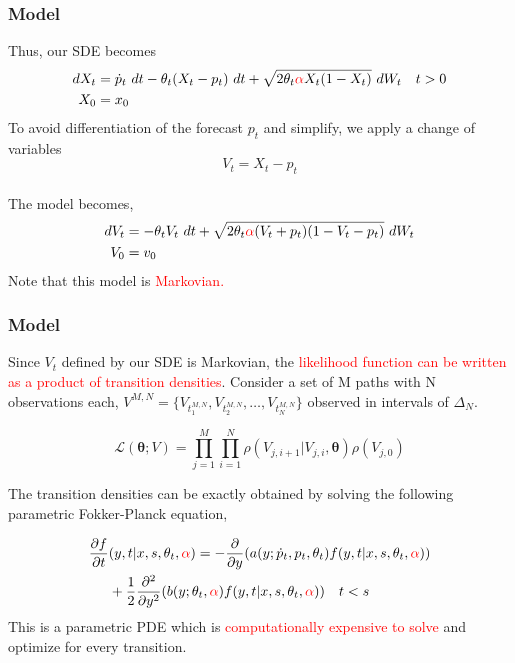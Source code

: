 \documentclass[aspectratio=169]{beamer}\usepackage[utf8]{inputenc}
\begin{document}
\begin{frame}\frametitle{Model}
Thus, our SDE becomes
\begin{equation}
\begin{split}
dX_t&= \dot{p}_t \ dt - \theta_t(X_t - p_t) \ dt + \sqrt{2 \theta_t \textcolor{red}{\alpha} X_t (1-X_t)}  \ dW_t \quad t > 0 \\
X_0&=x_0\\
\end{split}
\label{model:derivative_tracking_X}
\end{equation}
To avoid differentiation of the forecast $p_t$ and simplify, we apply a change of variables $$V_t = X_t - p_t$$ \\
The  model becomes,
\begin{equation}
\begin{split}
dV_t &=  - \theta_t V_t \  dt + \sqrt{2 \theta_t \textcolor{red}{\alpha} (V_t +p_t ) (1-V_t-p_t)} \  dW_t  \\ %
V_0 & = v_0\\
\end{split}\label{VtSDE}
\end{equation}
Note that this model is \textcolor{red}{Markovian.}
\end{frame}

\begin{frame}\frametitle{Model}
Since $V_t$ defined by our SDE is Markovian, the \textcolor{red}{ likelihood function can be written as a product of transition densities}.  Consider a set of M paths with N observations each, $ V^{M,N}=\{ V_{t_1^{M,N}} , V_{t_2^{M,N}} ,\ldots , V_{t_N^{M,N}} \}$ observed in intervals of $\Delta_N$.

\begin{equation}
\mathcal{L}(\bm{\theta};V) =\prod\limits_{j=1}^M \prod\limits_{i=1}^N \rho ( {V_{j,i+1}|V_{j,i}}, \bm{\theta})  \rho (V_{j,0})
\label{likelihood}
\end{equation}

The transition densities can be exactly obtained by solving the following parametric Fokker-Planck equation,

\begin{equation}
\begin{split}
\frac{ \partial f }{\partial t } & (y ,t | x , s, \theta_t, \textcolor{red}{\alpha} )= - \frac{\partial}{ \partial y} ( a( y;\dot{p}_t , p_t, \theta_t ) f( y ,t | x , s, \theta_t , \textcolor{red}{\alpha} ) ) \\
& + \frac{1}{2} \frac{\partial^2}{ \partial y^2} ( b(y;\theta_t, \textcolor{red}{\alpha}  )  f( y ,t | x , s, \theta_t , \textcolor{red}{\alpha} )  ) \quad  t < s\\
\end{split}
\end{equation}
This is a parametric PDE which is \textcolor{red}{computationally expensive to solve} and optimize for every transition.
\end{frame}
\end{document}
